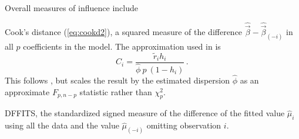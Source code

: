 \documentclass[11pt]{book}\usepackage[]{graphicx}\usepackage[]{color}
\begin{document}
Overall measures of influence include
\begin{itemize*}
  \item Cook's distance (\eqref{eq:cookd2}),
a squared measure of the difference $\widehat{\vec{\beta}} - \widehat{\vec{\beta}}_{(-i)}$
in all $p$ coefficients in the model.  The approximation used in  is
\begin{equation*}
C_i = \frac{\widetilde{r}_i h_i}{\widehat{\phi} \: p \: (1-h_i)}  \period
\end{equation*}
This follows \citet{Williams:87}, but scales the result by the estimated dispersion $\widehat{\phi}$
as an approximate $F_{p, n-p}$ statistic rather than $\chi^2_p$.
  \item DFFITS, the standardized signed measure of the difference of the fitted value
  $\widehat{\mu}_i$ using all the data and the value  $\widehat{\mu}_{(-i)}$ omitting observation $i$.
\end{itemize*}
\end{document}
